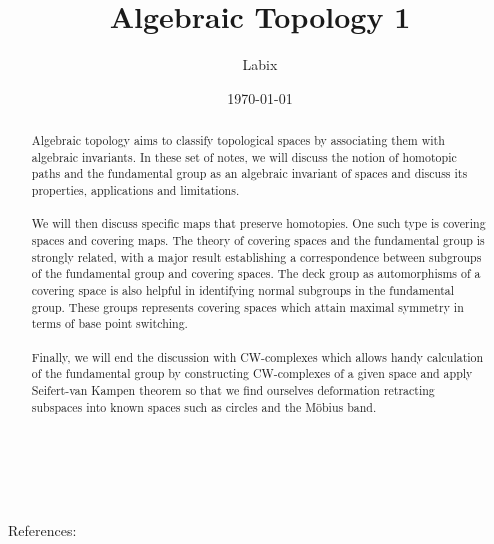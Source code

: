 \documentclass[a4paper]{article}
\title{Algebraic Topology 1}
\author{Labix}
\date{\today}
\begin{document}
\maketitle
\begin{abstract}
Algebraic topology aims to classify topological spaces by associating them with algebraic invariants. In these set of notes, we will discuss the notion of homotopic paths and the fundamental group as an algebraic invariant of spaces and discuss its properties, applications and limitations. \\~\\

We will then discuss specific maps that preserve homotopies. One such type is covering spaces and covering maps. The theory of covering spaces and the fundamental group is strongly related, with a major result establishing a correspondence between subgroups of the fundamental group and covering spaces. The deck group as automorphisms of a covering space is also helpful in identifying normal subgroups in the fundamental group. These groups represents covering spaces which attain maximal symmetry in terms of base point switching. \\~\\

Finally, we will end the discussion with CW-complexes which allows handy calculation of the fundamental group by constructing CW-complexes of a given space and apply Seifert-van Kampen theorem so that we find ourselves deformation retracting subspaces into known spaces such as circles and the Möbius band. \\~\\
~\\~\\
\end{abstract}
References: 
\end{document}
